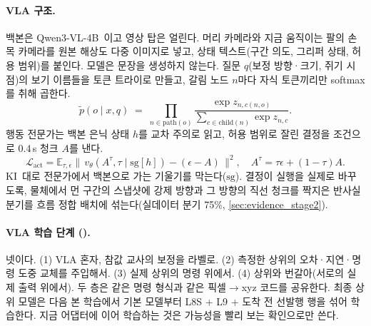 \paragraph{VLA 구조.} 백본은 Qwen3-VL-4B~\cite{qwen3vl2025}이고 영상 탑은 얼린다. 머리 카메라와 지금 움직이는 팔의 손목 카메라를 원본 해상도 다중 이미지로 넣고, 상태 텍스트(구간 의도, 그리퍼 상태, 허용 범위)를 붙인다. 모델은 문장을 생성하지 않는다. 질문 $q$(보정 방향·크기, 쥐기 시점)의 보기 이름들을 토큰 트라이로 만들고, 갈림 노드 $n$마다 자식 토큰끼리만 softmax를 취해 곱한다.
\begin{equation}
  \tilde p(o\mid x,q) \;=\; \prod_{n\in\mathrm{path}(o)} \frac{\exp z_{n,c(n,o)}}{\sum_{c\in\mathrm{child}(n)}\exp z_{n,c}}.
  \label{eq:trie}
\end{equation}
행동 전문가는 백본 은닉 상태 $h$를 교차 주의로 읽고, 허용 범위로 잘린 결정을 조건으로 0.4\,s 청크 $A$를 낸다.
\begin{equation}
  \mathcal{L}_{\text{act}} = \mathbb{E}_{\tau,\epsilon}\bigl\|\,v_\theta(A^\tau, \tau \mid \mathrm{sg}[h]) - (\epsilon - A)\,\bigr\|^2,\quad A^\tau = \tau\epsilon + (1-\tau)A.
  \label{eq:fm}
\end{equation}
KI~\cite{kinsulate2025}대로 전문가에서 백본으로 가는 기울기를 막는다($\mathrm{sg}$). 결정이 실행을 실제로 바꾸도록, 물체에서 먼 구간의 스냅샷에 강제 방향과 그 방향의 직선 청크를 짝지은 반사실 분기를 흐름 정합 배치에 섞는다(실데이터 분기 75\%, \cref{sec:evidence_stage2}).

\paragraph{VLA 학습 단계 ().} 넷이다. (1) VLA 혼자, 참값 교사의 보정을 라벨로. (2) 측정한 상위의 오차·지연·명령 도중 교체를 주입해서. (3) 실제 상위의 명령 위에서. (4) 상위와 번갈아(서로의 실제 출력 위에서). 두 층은 같은 명령 형식과 같은 픽셀$\rightarrow$xyz 코드를 공유한다. 최종 상위 모델은 다음 본 학습에서 기본 모델부터 L8S + L9 + 도착 전 선발행 행을 섞어 학습한다. 지금 어댑터에 이어 학습하는 것은 가능성을 빨리 보는 확인으로만 쓴다.

